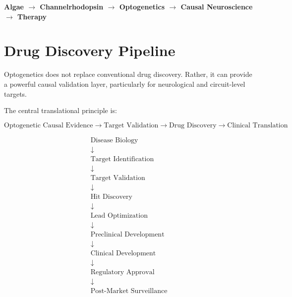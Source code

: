 \documentclass[11pt]{article}
\begin{document}
\begin{center}
{\color{SteelBlue}\Large\bfseries
Algae $\rightarrow$ Channelrhodopsin $\rightarrow$
Optogenetics $\rightarrow$ Causal Neuroscience $\rightarrow$ Therapy}
\end{center}

\newpage

\section{Drug Discovery Pipeline}

Optogenetics does not replace conventional drug discovery.
Rather, it can provide a powerful causal validation layer,
particularly for neurological and circuit-level targets.

The central translational principle is:

\[
\boxed{
\text{Optogenetic Causal Evidence}
\rightarrow
\text{Target Validation}
\rightarrow
\text{Drug Discovery}
\rightarrow
\text{Clinical Translation}
}
\]

\begin{tcolorbox}[colback=SteelBlue!5,colframe=SteelBlue,
  title=\textbf{From Biological Discovery to Medicine},fonttitle=\bfseries]
\begin{center}
\[
\boxed{
\begin{array}{c}
\text{Disease Biology}\\ \downarrow \\
\text{Target Identification}\\ \downarrow \\
\text{Target Validation}\\ \downarrow \\
\text{Hit Discovery}\\ \downarrow \\
\text{Lead Optimization}\\ \downarrow \\
\text{Preclinical Development}\\ \downarrow \\
\text{Clinical Development}\\ \downarrow \\
\text{Regulatory Approval}\\ \downarrow \\
\text{Post-Market Surveillance}
\end{array}
}
\]
\end{center}
\end{tcolorbox}
\end{document}
